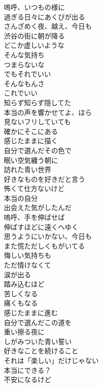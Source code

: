 \setlength{\columnseprule}{0pt}
\begin{multicols}{3}

  \newcommand{\fooA}[2]{%
    知らず知らず隠してた\\
    本当の声を響かせてよ、{}#1{}\\
    見ないフリしていても\\
    確かにそこに{}#2{}%
  }

  嗚呼、いつもの様に\\
  過ぎる日々にあくびが出る\\
  さんざめく夜、越え、今日も\\
  渋谷の街に朝が降る\\
  どこか虚しいような\\
  そんな気持ち\\
  つまらないな\\
  でもそれでいい\\
  そんなもんさ\\
  これでいい\\

  \fooA{ほら}{ある}\\

  感じたままに描く\\
  自分で選んだその色で\\
  眠い空気纏う朝に\\
  訪れた青い世界\\
  好きなものを好きだと言う\\
  怖くて仕方ないけど\\
  本当の自分\\
  出会えた気がしたんだ\\

  嗚呼、手を伸ばせば\\
  伸ばすほどに遠くへゆく\\
  思うようにいかない、今日も\\
  また慌ただしくもがいてる\\
  悔しい気持ちも\\
  ただ情けなくて\\
  涙が出る\\
  踏み込むほど\\
  苦しくなる\\
  痛くもなる\\

  感じたままに進む\\
  自分で選んだこの道を\\
  重い擦る夜に\\
  しがみついた青い誓い\\
  好きなことを続けること\\
  それは「楽しい」だけじゃない\\
  本当にできる？\\
  不安になるけど\\


\end{multicols}
